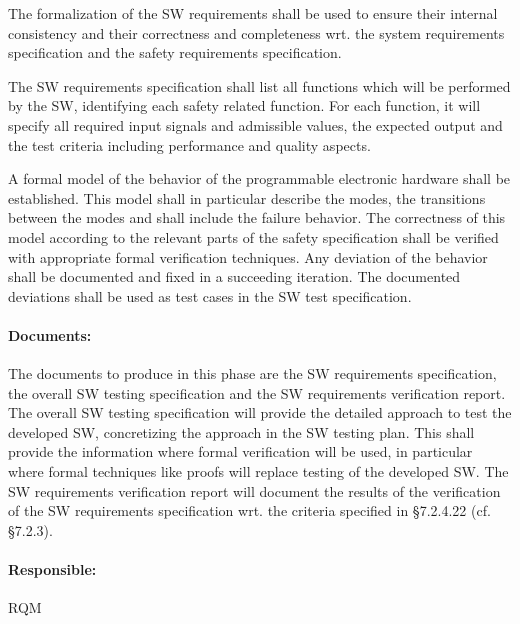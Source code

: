 The formalization of the SW requirements shall be used to ensure their internal
consistency and their correctness and completeness wrt. the system requirements
specification and the safety requirements specification.

The SW requirements specification shall list all functions which will be
performed by the SW, identifying each safety related function. For each
function, it will specify all required input signals and admissible values, the
expected output and the test criteria including performance and quality aspects.

A formal model of the behavior of the programmable electronic hardware shall be
established. This model shall in particular describe the modes, the transitions
between the modes and shall include the failure behavior. The correctness of
this model according to the relevant parts of the safety specification shall be
verified with appropriate formal verification techniques. Any deviation of the
behavior shall be documented and fixed in a succeeding iteration. The documented
deviations shall be used as test cases in the SW test specification.


\paragraph{Documents:}
\label{sec:sw-req-documents}
The documents to produce in this phase are the SW requirements specification,
the overall SW testing specification and the SW requirements verification
report.  The overall SW testing specification will provide the detailed approach
to test the developed SW, concretizing the approach in the SW testing plan. This
shall provide the information where formal verification will be used, in
particular where formal techniques like proofs will replace testing of the
developed SW.  The SW requirements verification report will document the results
of the verification of the SW requirements specification wrt. the criteria
specified in §7.2.4.22 (cf. §7.2.3).

\paragraph{Responsible:}
\label{sec:sw-req-responsible}
RQM

